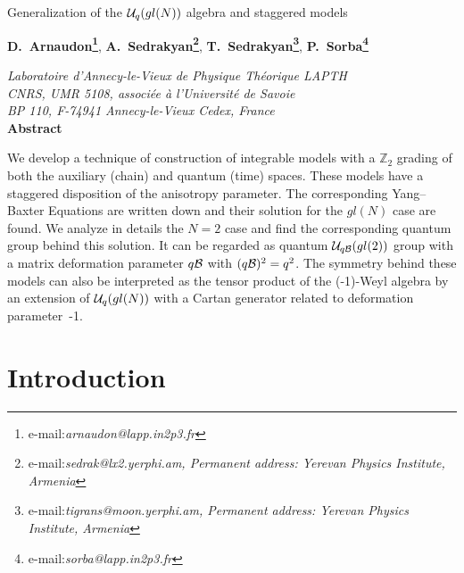 \documentclass[a4paper,a4paper]{article}
\def\ZZ{{\mathbb Z}}
\begin{document}
\pagestyle{empty}

\begin{center} 
\textsf{\Large 
{Generalization of the ${\cal U}_q(gl(N))$ algebra and staggered models}} 
  
\vspace{36pt}
{\bf D.~Arnaudon\footnote{e-mail:{\sl arnaudon@lapp.in2p3.fr}}},
{\bf A.~Sedrakyan\footnote{e-mail:{\sl sedrak@lx2.yerphi.am,
Permanent address: Yerevan Physics Institute, Armenia}}},
{\bf T.~Sedrakyan\footnote{e-mail:{\sl tigrans@moon.yerphi.am,
Permanent address: Yerevan Physics Institute, Armenia}}},
{\bf P.~Sorba\footnote{e-mail:{\sl sorba@lapp.in2p3.fr}}}\\  

\vspace{30pt}

\emph{Laboratoire d'Annecy-le-Vieux de Physique Th{\'e}orique LAPTH}
\\
\emph{CNRS, UMR 5108, associ{\'e}e {\`a} l'Universit{\'e} de Savoie}
\\
\emph{BP 110, F-74941 Annecy-le-Vieux Cedex, France}
\\

\vfill
{\bf Abstract}
\end{center}

We develop a technique of construction of integrable models
with a $\ZZ_2$ grading of both the auxiliary (chain) and quantum (time)
spaces. These models have a staggered disposition of the anisotropy
parameter. The corresponding Yang--Baxter Equations are written
down and their solution for the $gl(N)$ case are found. We analyze
in details the $N=2$ case and find the corresponding
quantum group behind this solution. It can be regarded as
quantum ${\cal U}_{q{\cal B}}(gl(2))$ group with a matrix deformation parameter
$q{\cal B}$ with $(q{\cal B})^2=q^2$.
The symmetry behind these models can also be interpreted as the tensor
product of the (-1)-Weyl algebra by an extension of ${\cal U}_q(gl(N))$
with a Cartan generator related to deformation parameter~-1. 

\vfill
{}

\newpage
\pagestyle{plain}
\setcounter{page}{1}


\section{Introduction}
\setcounter{equation}{0}
\end{document}
